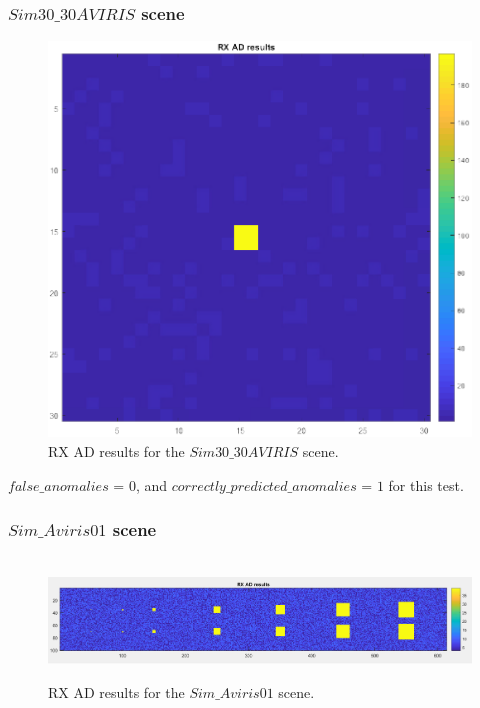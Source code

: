 \subsubsection{$Sim30\_30AVIRIS$ scene }
\begin{figure}[H]
\centering
   \includegraphics[scale=0.4]{images/AD_testing/synthetic_images/rx_ad_30_30.png}
  \caption{ RX AD results for the $Sim30\_30AVIRIS$ scene.} 
  \label{fig:rx_sim_aviris_30_30}
\end{figure}

 $false\_anomalies$ = 0, and  $correctly\_predicted\_anomalies$ = $1$ for this test.


\subsubsection{$Sim\_Aviris01$ scene }
\begin{figure}[H]
\hbox{\hspace*{-1cm}                                              
   \includegraphics[scale=0.4]{images/AD_testing/synthetic_images/rx_ad_614_100.png}}
  \caption{ RX AD results for the $Sim\_Aviris01$ scene.} 
  \label{fig:rx_sim_aviris_01}
\end{figure}

